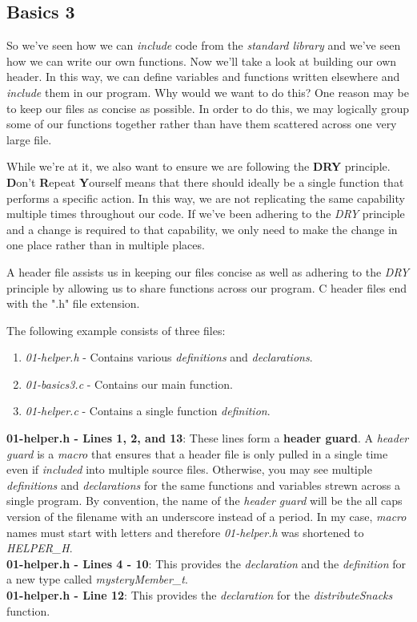 \documentclass[../main.tex]{subfiles}
\begin{document}
\subsection{Basics 3}
So we've seen how we can \textit{include} code from the \textit{standard library} and we've seen how we can write our own functions.  Now we'll take a look at building our own header.  In this way, we can define variables and functions written elsewhere and \textit{include} them in our program.  Why would we want to do this?  One reason may be to keep our files as concise as possible.  In order to do this, we may logically group some of our functions together rather than have them scattered across one very large file.  

While we're at it, we also want to ensure we are following the \textbf{DRY} principle. \textbf{D}on't \textbf{R}epeat \textbf{Y}ourself means that there should ideally be a single function that performs a specific action.  In this way, we are not replicating the same capability multiple times throughout our code.  If we've been adhering to the \textit{DRY} principle and a change is required to that capability, we only need to make the change in one place rather than in multiple places.

A header file assists us in keeping our files concise as well as adhering to the \textit{DRY} principle by allowing us to share functions across our program.  C header files end with the ".h" file extension.

The following example consists of three files:
\begin{enumerate}
	\item \textit{01-helper.h} - Contains various \textit{definitions} and \textit{declarations}.
	\item \textit{01-basics3.c} - Contains our main function.
	\item \textit{01-helper.c} - Contains a single function \textit{definition}.
\end{enumerate}



\textbf{01-helper.h - Lines 1, 2, and 13}: These lines form a \textbf{header guard}.  A \textit{header guard} is a \textit{macro} that ensures that a header file is only pulled in a single time even if \textit{included} into multiple source files.  Otherwise, you may see multiple \textit{definitions} and \textit{declarations} for the same functions and variables strewn across a single program. By convention, the name of the \textit{header guard} will be the all caps version of the filename with an underscore instead of a period.  In my case, \textit{macro} names must start with letters and therefore \textit{01-helper.h} was shortened to \textit{HELPER\_H}.\\
\textbf{01-helper.h - Lines 4 - 10}: This provides the \textit{declaration} and the \textit{definition} for a new type called \textit{mysteryMember\_t}\cite{embedded_c}.\\
\textbf{01-helper.h - Line 12}:  This provides the \textit{declaration} for the \textit{distributeSnacks} function.\\
\end{document}
